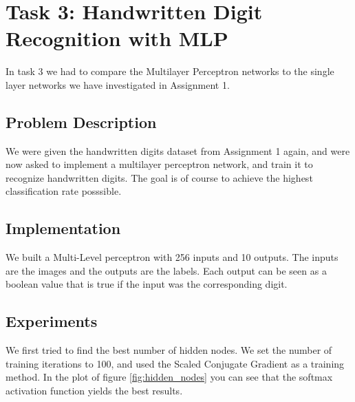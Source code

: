 \documentclass{article}
\begin{document}
\newpage
\section{Task 3: Handwritten Digit Recognition with MLP}
In task 3 we had to compare the Multilayer Perceptron networks to the single layer networks we have investigated in Assignment 1.

\subsection{Problem Description}
We were given the handwritten digits dataset from Assignment 1 again, and were now asked to implement a multilayer perceptron network, and train it to recognize handwritten digits.
The goal is of course to achieve the highest classification rate posssible.

\subsection{Implementation}
We built a Multi-Level perceptron with 256 inputs and 10 outputs. The inputs are the images and the outputs are the labels. Each output can be seen as a boolean value that is true if the input was the corresponding digit. 


\newpage
\subsection{Experiments}
We first tried to find the best number of hidden nodes. We set the number of training iterations to 100, and used the Scaled Conjugate Gradient as a training method. In the plot of figure \ref{fig:hidden_nodes} you can see that the softmax activation function yields the best results.
\end{document}
